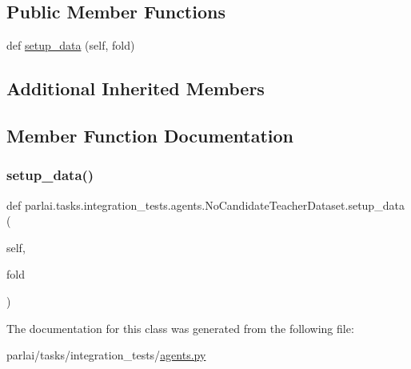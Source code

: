 \subsection*{Public Member Functions}
\begin{DoxyCompactItemize}
\item 
def \hyperlink{classparlai_1_1tasks_1_1integration__tests_1_1agents_1_1NoCandidateTeacherDataset_a668aa7a9cad783f8e0a7f318271dda76}{setup\+\_\+data} (self, fold)
\end{DoxyCompactItemize}
\subsection*{Additional Inherited Members}


\subsection{Member Function Documentation}
\mbox{\label{classparlai_1_1tasks_1_1integration__tests_1_1agents_1_1NoCandidateTeacherDataset_a668aa7a9cad783f8e0a7f318271dda76}} 
\subsubsection{\texorpdfstring{setup\+\_\+data()}{setup\_data()}}
{\footnotesize\ttfamily def parlai.\+tasks.\+integration\+\_\+tests.\+agents.\+No\+Candidate\+Teacher\+Dataset.\+setup\+\_\+data (\begin{DoxyParamCaption}\item[{}]{self,  }\item[{}]{fold }\end{DoxyParamCaption})}



The documentation for this class was generated from the following file\+:\begin{DoxyCompactItemize}
\item 
parlai/tasks/integration\+\_\+tests/\hyperlink{parlai_2tasks_2integration__tests_2agents_8py}{agents.\+py}\end{DoxyCompactItemize}
